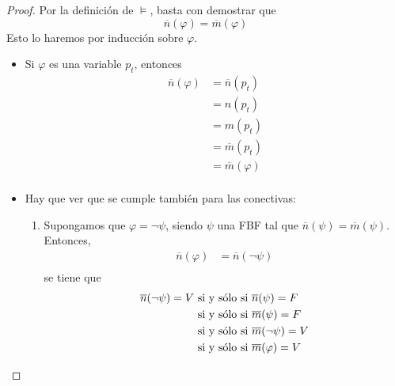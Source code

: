 \documentclass[12pt]{report}
\newcounter{it}
\theoremstyle{largebreak}
\begin{document}
    \begin{proof}
        Por la definición de $\vDash$, basta con demostrar que
        \begin{equation*}
            \overline{n}(\varphi)=\overline{m}(\varphi)
        \end{equation*}
        Esto lo haremos por inducción sobre $\varphi$.
        \begin{itemize}
            \item Si $\varphi$ es una variable $p_t$, entonces
            \begin{equation*}
                \begin{split}
                    \overline{n}(\varphi)&=\overline{n}(p_t)\\
                    &=n(p_t)\\
                    &=m(p_t)\\
                    &=\overline{m}(p_t)\\
                    &=\overline{m}(\varphi)\\
                \end{split}
            \end{equation*}
            \item Hay que ver que se cumple también para las conectivas:
            \begin{enumerate}
                \item Supongamos que $\varphi=\neg\psi$, siendo $\psi$ una FBF tal que $\overline{n}(\psi)=\overline{m}(\psi)$. Entonces,
                \begin{equation*}
                    \begin{split}
                        \overline{n}(\varphi)&=\overline{n}(\neg\psi)\\
                    \end{split}
                \end{equation*}
                se tiene que
                \begin{equation*}
                    \begin{split}
                        \overline{n}(\neg\psi)=V&\textup{ si y sólo si } \overline{n}(\psi)=F\\
                        &\textup{ si y sólo si } \overline{m}(\psi)=F\\
                        &\textup{ si y sólo si } \overline{m}(\neg\psi)=V\\
                        &\textup{ si y sólo si } \overline{m}(\varphi)=V\\

\end{split}
\end{equation*}
\end{enumerate}
\end{itemize}
\end{proof}
\end{document}
